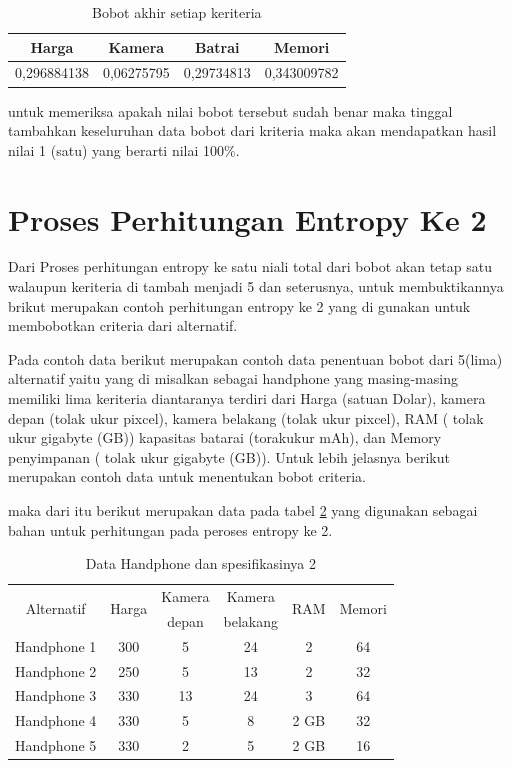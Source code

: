 \begin{table}[h]
\caption{Bobot akhir setiap keriteria}
\centering
\begin{tabular}{|c|c|c|c|}
\hline
 Harga & Kamera & Batrai&Memori\\
\hline
0,296884138&0,06275795 &0,29734813&0,343009782\\
\hline
\end{tabular}
\label{table16}
\end{table}

untuk memeriksa apakah nilai bobot tersebut sudah benar maka tinggal tambahkan keseluruhan data bobot dari kriteria maka akan mendapatkan hasil nilai 1 (satu) yang berarti nilai 100\%.

\section{Proses Perhitungan Entropy Ke 2}

Dari Proses perhitungan entropy ke satu niali total dari bobot akan tetap satu walaupun keriteria di tambah menjadi 5 dan seterusnya, untuk membuktikannya brikut merupakan contoh perhitungan entropy ke 2 yang di gunakan untuk membobotkan criteria dari alternatif.\par
	Pada contoh data berikut merupakan contoh data penentuan bobot dari 5(lima) alternatif yaitu yang di misalkan sebagai handphone yang masing-masing memiliki lima keriteria diantaranya terdiri dari Harga (satuan Dolar), kamera depan (tolak ukur pixcel), kamera belakang (tolak ukur pixcel), RAM ( tolak ukur gigabyte (GB)) kapasitas batarai (torakukur mAh), dan Memory penyimpanan ( tolak ukur gigabyte (GB)). Untuk lebih jelasnya berikut merupakan contoh data untuk menentukan bobot criteria.

maka dari itu berikut merupakan data pada tabel \ref{TA1} yang digunakan sebagai bahan untuk perhitungan pada peroses entropy ke 2.


\begin{table}[h]
\caption{Data Handphone dan spesifikasinya 2}
\centering
\begin{tabular}{|c|c|c|c|c|c|}
\hline
\multirow{2}{*}{Alternatif} &\multirow{2}{*}{ Harga}& Kamera & Kamera&\multirow{2}{*}{RAM}& \multirow{2}{*}{Memori}\\
& & depan & belakang & &\\
\hline
Handphone 1 &300& 5 & 24 &  2&64\\
\hline
Handphone 2 &250 & 5 & 13 &  2&32\\
\hline
Handphone 3 &330 & 13 & 24 &  3 &64\\
\hline
Handphone 4 &330 & 5 & 8 &  2 GB&32\\
\hline
Handphone 5 &330 & 2 & 5 &  2 GB&16\\
\hline

\end{tabular}
\label{TA1}
\end{table}

